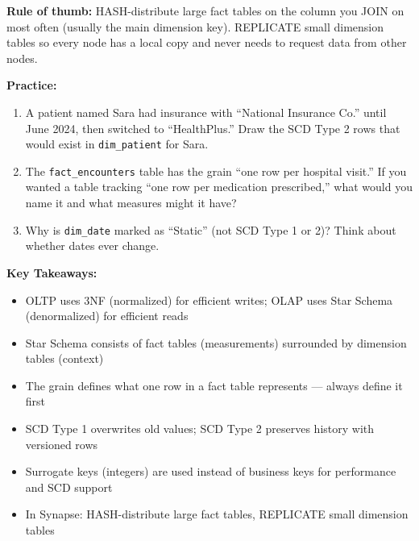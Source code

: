 \documentclass[12pt, a4paper, oneside]{report}
\begin{document}
\begin{tipbox}
    \textbf{Rule of thumb:} HASH-distribute large fact tables on the column you JOIN on most often (usually the main dimension key). REPLICATE small dimension tables so every node has a local copy and never needs to request data from other nodes.
\end{tipbox}

\begin{exercisebox}
\textbf{Practice:}
\begin{enumerate}
    \item A patient named Sara had insurance with ``National Insurance Co.'' until June 2024, then switched to ``HealthPlus.'' Draw the SCD Type 2 rows that would exist in \texttt{dim\_patient} for Sara.
    \item The \texttt{fact\_encounters} table has the grain ``one row per hospital visit.'' If you wanted a table tracking ``one row per medication prescribed,'' what would you name it and what measures might it have?
    \item Why is \texttt{dim\_date} marked as ``Static'' (not SCD Type 1 or 2)? Think about whether dates ever change.
\end{enumerate}
\end{exercisebox}

\begin{summarybox}
\textbf{Key Takeaways:}
\begin{itemize}
    \item OLTP uses 3NF (normalized) for efficient writes; OLAP uses Star Schema (denormalized) for efficient reads
    \item Star Schema consists of fact tables (measurements) surrounded by dimension tables (context)
    \item The grain defines what one row in a fact table represents --- always define it first
    \item SCD Type 1 overwrites old values; SCD Type 2 preserves history with versioned rows
    \item Surrogate keys (integers) are used instead of business keys for performance and SCD support
    \item In Synapse: HASH-distribute large fact tables, REPLICATE small dimension tables
\end{itemize}
\end{summarybox}


\end{document}
